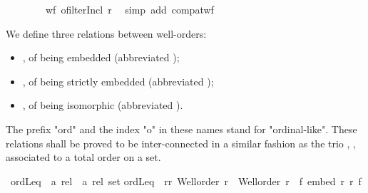 \begin{isabellebody}
\ \ \isamarkupfalse%
\isanewline
\ \ \isamarkupfalse%
\ \isamarkupfalse%
\ {\isachardoublequoteopen}wf\ {\isacharparenleft}{\kern0pt}ofilterIncl\ r{\isacharparenright}{\kern0pt}{\isachardoublequoteclose}\ \isamarkupfalse%
\ {\isacharparenleft}{\kern0pt}simp\ add{\isacharcolon}{\kern0pt}\ compat{\isacharunderscore}{\kern0pt}wf{\isacharparenright}{\kern0pt}\isanewline
{}\isamarkupfalse%
%
\endisatagproof
{\isafoldproof}%
%
\isadelimproof
%
\endisadelimproof
%
\isadelimdocument
%
\endisadelimdocument
%
\isatagdocument
%
\isamarkuptrue%
%
\endisatagdocument
{\isafolddocument}%
%
\isadelimdocument
%
\endisadelimdocument
%
\begin{isamarkuptext}%
We define three relations between well-orders:
\begin{itemize}
\item {}, of being embedded (abbreviated );
\item {}, of being strictly embedded (abbreviated );
\item {}, of being isomorphic (abbreviated ).
\end{itemize}
%
The prefix "ord" and the index "o" in these names stand for "ordinal-like".
These relations shall be proved to be inter-connected in a similar fashion as the trio
\isa{{\isasymle}}, \isa{{\isacharless}{\kern0pt}}, \isa{{\isacharequal}{\kern0pt}} associated to a total order on a set.%
\end{isamarkuptext}\isamarkuptrue%
\isamarkupfalse%
\ ordLeq\ {\isacharcolon}{\kern0pt}{\isacharcolon}{\kern0pt}\ {\isachardoublequoteopen}{\isacharparenleft}{\kern0pt}{\isacharprime}{\kern0pt}a\ rel\ {\isacharasterisk}{\kern0pt}\ {\isacharprime}{\kern0pt}a{\isacharprime}{\kern0pt}\ rel{\isacharparenright}{\kern0pt}\ set{\isachardoublequoteclose}\isanewline
{}\isanewline
{\isachardoublequoteopen}ordLeq\ {\isacharequal}{\kern0pt}\ {\isacharbraceleft}{\kern0pt}{\isacharparenleft}{\kern0pt}r{\isacharcomma}{\kern0pt}r{\isacharprime}{\kern0pt}{\isacharparenright}{\kern0pt}{\isachardot}{\kern0pt}\ Well{\isacharunderscore}{\kern0pt}order\ r\ {\isasymand}\ Well{\isacharunderscore}{\kern0pt}order\ r{\isacharprime}{\kern0pt}\ {\isasymand}\ {\isacharparenleft}{\kern0pt}{\isasymexists}f{\isachardot}{\kern0pt}\ embed\ r\ r{\isacharprime}{\kern0pt}\ f{\isacharparenright}{\kern0pt}{\isacharbraceright}{\kern0pt}{\isachardoublequoteclose}\isanewline

\end{isabellebody}
